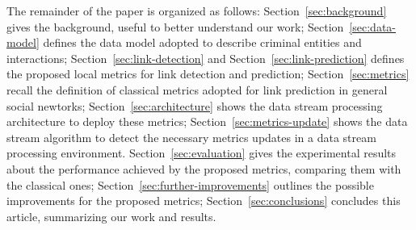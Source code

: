 
The remainder of the paper is organized as follows:
Section~\ref{sec:background} gives the background, useful to better understand our work;
Section~\ref{sec:data-model} defines the data model adopted to describe criminal entities and interactions;
Section~\ref{sec:link-detection} and Section~\ref{sec:link-prediction} defines the proposed local metrics for link detection and prediction;
Section~\ref{sec:metrics} recall the definition of classical metrics adopted for link prediction in general social newtorks;
Section~\ref{sec:architecture} shows the data stream processing architecture to deploy these metrics;
Section~\ref{sec:metrics-update} shows the data stream algorithm to detect the necessary metrics updates in a data stream processing environment.
Section~\ref{sec:evaluation} gives the experimental results about the performance achieved by the proposed metrics, comparing them with the classical ones;
Section~\ref{sec:further-improvements} outlines the possible improvements for the proposed metrics;
Section~\ref{sec:conclusions} concludes this article, summarizing our work and results.
